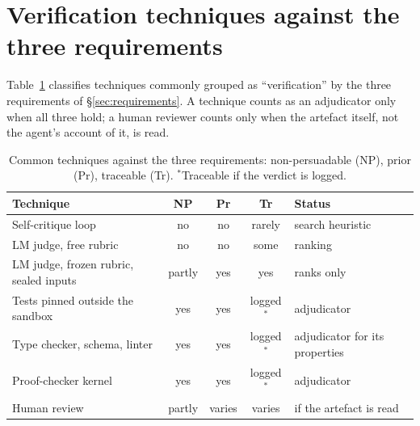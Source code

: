 \section{Verification techniques against the three requirements}
\label{app:techniques}

Table~\ref{tab:techniques} classifies techniques commonly grouped as ``verification'' by the three requirements of \S\ref{sec:requirements}. A technique counts as an adjudicator only when all three hold; a human reviewer counts only when the artefact itself, not the agent's account of it, is read.

\begin{table}[H]
\centering\small
\begin{tabular}{@{}p{5.2cm}cccp{4.2cm}@{}}
\toprule
Technique & NP & Pr & Tr & Status \\
\midrule
Self-critique loop & no & no & rarely & search heuristic \\
LM judge, free rubric & no & no & some & ranking \\
LM judge, frozen rubric, sealed inputs & partly & yes & yes & ranks only \\
Tests pinned outside the sandbox & yes & yes & logged$^*$ & adjudicator \\
Type checker, schema, linter & yes & yes & logged$^*$ & adjudicator for its properties \\
Proof-checker kernel & yes & yes & logged$^*$ & adjudicator \\
Human review & partly & varies & varies & if the artefact is read \\
\bottomrule
\end{tabular}
\caption{Common techniques against the three requirements: non-persuadable (NP), prior (Pr), traceable (Tr). $^*$Traceable if the verdict is logged.}
\label{tab:techniques}
\end{table}
